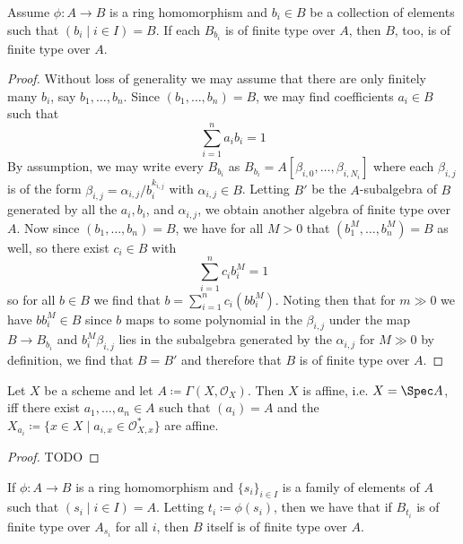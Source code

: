 \documentclass[wip, algebra]{bsteffan-lecturenotes}
\newcommand{\cO}{\mathcal{O}}
\begin{document}
\begin{proposition}
	Assume $\phi\colon A \to B$ is a ring homomorphism and $b_i \in B$ be a collection of elements such that $(b_i \mid i \in I) = B$.
	If each $B_{b_i}$ is of finite type over $A$, then $B$, too, is of finite type over $A$.
\end{proposition}
\begin{proof}
	Without loss of generality we may assume that there are only finitely many $b_i$, say $b_1, \ldots, b_n$.
	Since $(b_1, \ldots, b_n) = B$, we may find coefficients $a_i \in B$ such that
	\begin{equation*}
		\sum_{i = 1}^n a_i b_i = 1
	\end{equation*}
	By assumption, we may write every $B_{b_i}$ as $B_{b_i} = A[\beta_{i, 0}, \ldots, \beta_{i, N_i}]$ where each $\beta_{i, j}$ is of the form $\beta_{i, j} = \alpha_{i, j} / b_i^{k_{i, j}}$ with $\alpha_{i, j} \in B$.
	Letting $B'$ be the $A$-subalgebra of $B$ generated by all the $a_i, b_i$, and $\alpha_{i, j}$, we obtain another algebra of finite type over $A$.
	Now since $(b_1, \ldots, b_n) = B$, we have for all $M > 0$ that $(b_1^M, \ldots, b_n^M) = B$ as well, so there exist $c_i \in B$ with
	\begin{equation*}
		\sum_{i = 1}^n c_i b_i^M = 1
	\end{equation*}
	so for all $b \in B$ we find that $b = \sum_{i = 1}^n c_i (b b_i^M)$.
	Noting then that for $m \gg 0$ we have $b b_i^M \in B$ since $b$ maps to some polynomial in the $\beta_{i, j}$ under the map $B \to B_{b_i}$ and $b_i^M \beta_{i, j}$ lies in the subalgebra generated by the $\alpha_{i, j}$ for $M \gg 0$ by definition, we find that $B = B'$ and therefore that $B$ is of finite type over $A$. 
\end{proof}
\begin{proposition}
	Let $X$ be a scheme and let $A \coloneq \Gamma(X, \cO_X)$.
	Then $X$ is affine, i.e. $X = \Spec A$, iff there exist $a_1, \ldots, a_n \in A$ such that $(a_i) = A$ and the $X_{a_i} \coloneq \{x \in X \mid a_{i, x} \in \cO_{X, x}^*\}$ are affine.
\end{proposition}
\begin{proof}
	TODO
\end{proof}
\begin{proposition}
	If $\phi\colon A \to B$ is a ring homomorphism and $\{s_i\}_{i \in I}$ is a family of elements of $A$ such that $(s_i \mid i \in I) = A$.
	Letting $t_i \coloneq \phi(s_i)$, then we have that if $B_{t_i}$ is of finite type over $A_{s_i}$ for all $i$, then $B$ itself is of finite type over $A$.
\end{proposition}
\end{document}
